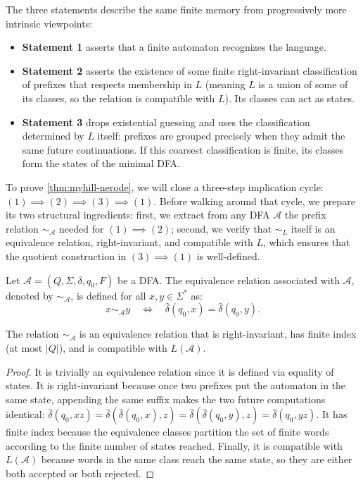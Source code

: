 The three statements describe the same finite memory from progressively
more intrinsic viewpoints:
\begin{itemize}
  \item \textbf{Statement 1} asserts that a finite automaton recognizes
  the language.
  \item \textbf{Statement 2} asserts the existence of some finite
  right-invariant classification of prefixes that respects membership
  in $L$ (meaning $L$ is a union of some of its classes, so the relation
  is compatible with $L$).  Its classes can act as states.
  \item \textbf{Statement 3} drops existential guessing and uses the
  classification determined by $L$ itself: prefixes are grouped precisely
  when they admit the same future continuations.  If this coarsest
  classification is finite, its classes form the states of the minimal
  DFA.
\end{itemize}

To prove \cref{thm:myhill-nerode}, we will close a three-step implication cycle: $(1)\implies(2)\implies(3)\implies(1)$. Before walking around that cycle, we prepare its two structural ingredients: first, we extract from any DFA $\mathcal{A}$ the prefix relation $\sim_{\mathcal{A}}$ needed for $(1)\implies(2)$; second, we verify that $\sim_L$ itself is an equivalence relation, right-invariant, and compatible with $L$, which ensures that the quotient construction in $(3)\implies(1)$ is well-defined.

\begin{definition}
\label{def:automaton-right-equivalence}
Let $\mathcal{A}=(Q,\Sigma,\delta,q_0,F)$ be a DFA.  The equivalence
relation associated with $\mathcal{A}$, denoted by $\sim_{\mathcal{A}}$,
is defined for all $x,y \in \Sigma^*$ as:
\[
  x \sim_{\mathcal{A}} y
  \quad\Longleftrightarrow\quad
  \widehat{\delta}(q_0,x)=\widehat{\delta}(q_0,y).
\]
\end{definition}

\begin{proposition}
\label{prop:automaton-relation-properties}
The relation $\sim_{\mathcal{A}}$ is an equivalence relation that is right-invariant, has finite index (at most $|Q|$), and is compatible with $L(\mathcal{A})$.
\end{proposition}

\begin{proof}
It is trivially an equivalence relation since it is defined via equality
of states. It is right-invariant because once two prefixes put the
automaton in the same state, appending the same suffix makes the two
future computations identical: $\widehat{\delta}(q_0,xz) = \widehat{\delta}(\widehat{\delta}(q_0,x),z) = \widehat{\delta}(\widehat{\delta}(q_0,y),z) = \widehat{\delta}(q_0,yz)$.
It has finite index because the equivalence classes partition the set
of finite words according to the finite number of states reached. Finally, it is compatible with $L(\mathcal{A})$ because words in the same class reach the same state, so they are either both accepted or both rejected.
\end{proof}

